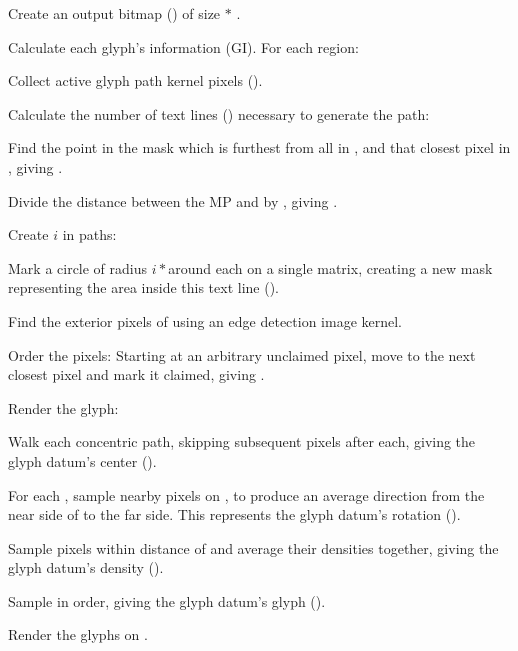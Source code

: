 \begin{deepEnum}
  \item Create an output bitmap (\OutBmSymbol) of size \SrcImgParSymbol \(*\) \OutSclParSymbol.
  \item Calculate each glyph's information (GI).
  For each region:
  \begin{deepEnum}
    \item Collect active glyph path kernel pixels (\ak).
    \item Calculate the number of text lines (\ntl) necessary to generate the path:
    \begin{deepEnum}
      \item Find the point in the mask which is furthest from all in \GlyphKrnParSymbol, and that closest pixel in \GlyphKrnParSymbol, giving \akc.
      \item Divide the distance between the MP and \akc\space by \LnHtParSymbol, giving \ntl.
    \end{deepEnum}
    \item Create \(i\) in \ntl\space paths:
    \begin{deepEnum}
      \item Mark a circle of radius \(i * \)\LnHtParSymbol\space around each \GlyphKrnParSymbol\space on a single matrix, creating a new mask representing the area inside this text line (\TextLineIMaskSymbol).
      \item Find the exterior pixels of \TextLineIMaskSymbol\space using an edge detection image kernel.
      \item Order the pixels: Starting at an arbitrary unclaimed pixel, move to the next closest pixel and mark it claimed, giving \TextLineISymbol.
      \item Render the glyph:
      \begin{deepEnum}
        \item Walk each concentric path, skipping \GlyphKrnParSymbol\space subsequent pixels after each, giving the glyph datum's center (\GDataCtrSymbol).
        \item For each \GDataCtrSymbol, sample \GlyphRotParSymbol\space nearby pixels on \TextLineISymbol, to produce an average direction from the near side of \GDataCtrSymbol\space to the far side.
        This represents the glyph datum's rotation (\GDataRotSymbol).
        \item Sample \SrcImgParSymbol\space pixels within \DnsSampleParSymbol\space distance of \GDataCtrSymbol\space and average their densities together, giving the glyph datum's density (\GDataDnsSymbol).
        \item Sample \SrcTxtParSymbol\space in order, giving the glyph datum's glyph (\GDataGlySymbol).
        \item Render the glyphs on \OutBmSymbol.
      \end{deepEnum}
    \end{deepEnum}
  \end{deepEnum}
\end{deepEnum}